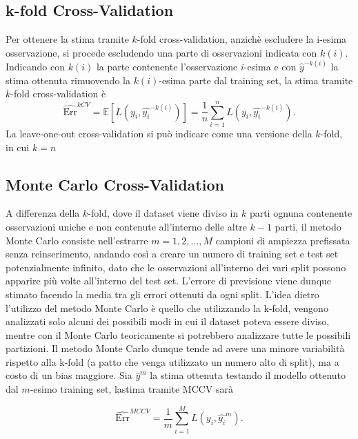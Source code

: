 \subsection{k-fold Cross-Validation}
\label{sec:sezione5.1.2}

Per ottenere la stima tramite $k$-fold cross-validation, anzichè escludere la i-esima osservazione, si procede escludendo una parte di osservazioni indicata con $k(i)$. Indicando con $k(i)$ la parte contenente l'osservazione $i$-esima e con $\hat{y}^{-k(i)}$ la stima ottenuta rimuovendo la $k(i)$-esima parte dal training set, la stima tramite $k$-fold cross-validation è
\begin{equation}
\widehat{\text{Err}}^{kCV} = \mathbb{E}[L(y_i, \hat{y_i}^{-k(i)})] = \frac{1}{n} \sum_{i=1}^{n} L(y_i, \hat{y_i}^{-k(i)}).
\end{equation}
La leave-one-out cross-validation si può indicare come una versione della $k$-fold, in cui $k = n$

\subsection{Monte Carlo Cross-Validation}
\label{sec:sezione5.1.3}

A differenza della $k$-fold, dove il dataset viene diviso in $k$ parti ognuna contenente osservazioni uniche e non contenute all'interno delle altre $k-1$ parti, il metodo Monte Carlo consiste nell'estrarre $m = 1,2,...,M$ campioni di ampiezza prefissata senza reinserimento, andando così a creare un numero di training set e test set potenzialmente infinito, dato che le osservazioni all'interno dei vari split possono apparire più volte all'interno del test set. L'errore di previsione viene dunque stimato facendo la media tra gli errori ottenuti da ogni split.
L'idea dietro l'utilizzo del metodo Monte Carlo è quello che utilizzando la k-fold, vengono analizzati solo alcuni dei possibili modi in cui il dataset poteva essere diviso, mentre con il Monte Carlo teoricamente si potrebbero analizzare tutte le possibili partizioni. Il metodo Monte Carlo dunque tende ad avere una minore variabilità rispetto alla k-fold (a patto che venga utilizzato un numero alto di split), ma a costo di un bias maggiore.
Sia $\hat{y}^{m}$ la stima ottenuta testando il modello ottenuto dal $m$-esimo training set, lastima tramite MCCV sarà

\begin{equation}
\widehat{\text{Err}}^{MCCV} = \frac{1}{m}\sum_{i=1}^{M}L(y_i, \hat{y_i}^{m}).
\end{equation}



